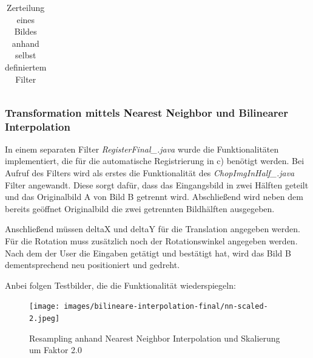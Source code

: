 \documentclass[12pt,german]{article}
\begin{document}
\begin{table}[H]
\begin{tabular}{| c | c | c |}
  \end{tabular}
  \caption{Zerteilung eines Bildes anhand selbst definiertem Filter}
  \label{tab:chopInHalfTest}
\end{table}



\subsubsection{Transformation mittels Nearest Neighbor und Bilinearer Interpolation}

In einem separaten Filter \textit{RegisterFinal_.java} wurde die Funktionalitäten implementiert, die für die automatische Registrierung in c) benötigt werden. Bei Aufruf des Filters wird als erstes die Funktionalität des \textit{ChopImgInHalf_.java} Filter angewandt. Diese sorgt dafür, dass das Eingangsbild in zwei Hälften geteilt und das Originalbild A von Bild B getrennt wird. Abschließend wird neben dem bereits geöffnet Originalbild die zwei getrennten Bildhälften ausgegeben.

Anschließend müssen deltaX und deltaY für die Translation angegeben werden. Für die Rotation muss zusätzlich noch der Rotationswinkel angegeben werden. Nach dem der User die Eingaben  getätigt und bestätigt hat, wird das Bild B dementsprechend neu positioniert und gedreht.

Anbei folgen Testbilder, die die Funktionalität wiederspiegeln:

\begin{figure}[H]
	\centering
	\texttt{[image: images/bilineare-interpolation-final/nn-scaled-2.jpeg]}
	\caption{Resampling anhand Nearest Neighbor Interpolation und Skalierung um Faktor 2.0}
	\label{fig:Translation-Rotation}
\end{figure}



\end{document}
